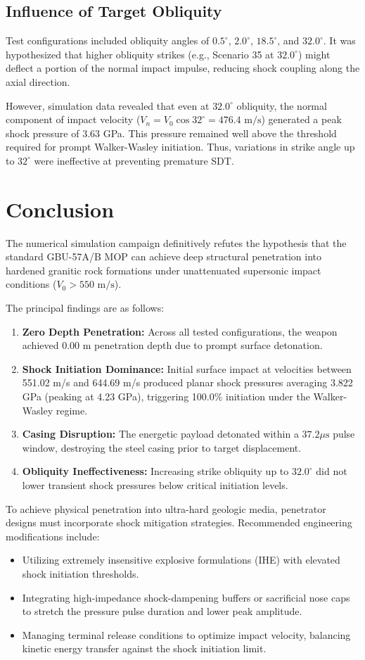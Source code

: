 \documentclass[11pt,a4paper]{article}
\begin{document}
\subsection{Influence of Target Obliquity}
Test configurations included obliquity angles of $0.5^\circ$, $2.0^\circ$, $18.5^\circ$, and $32.0^\circ$. It was hypothesized that higher obliquity strikes (e.g., Scenario 35 at $32.0^\circ$) might deflect a portion of the normal impact impulse, reducing shock coupling along the axial direction.

However, simulation data revealed that even at $32.0^\circ$ obliquity, the normal component of impact velocity ($V_n = V_0 \cos 32^\circ = 476.4\text{ m/s}$) generated a peak shock pressure of 3.63 GPa. This pressure remained well above the threshold required for prompt Walker-Wasley initiation. Thus, variations in strike angle up to $32^\circ$ were ineffective at preventing premature SDT.

\section{Conclusion}
The numerical simulation campaign definitively refutes the hypothesis that the standard GBU-57A/B MOP can achieve deep structural penetration into hardened granitic rock formations under unattenuated supersonic impact conditions ($V_0 > 550\text{ m/s}$). 

The principal findings are as follows:
\begin{enumerate}
\item \textbf{Zero Depth Penetration:} Across all tested configurations, the weapon achieved 0.00 m penetration depth due to prompt surface detonation.
\item \textbf{Shock Initiation Dominance:} Initial surface impact at velocities between 551.02 m/s and 644.69 m/s produced planar shock pressures averaging 3.822 GPa (peaking at 4.23 GPa), triggering 100.0\% initiation under the Walker-Wasley regime.
\item \textbf{Casing Disruption:} The energetic payload detonated within a $37.2\mu\text{s}$ pulse window, destroying the steel casing prior to target displacement.
\item \textbf{Obliquity Ineffectiveness:} Increasing strike obliquity up to $32.0^\circ$ did not lower transient shock pressures below critical initiation levels.
\end{enumerate}

To achieve physical penetration into ultra-hard geologic media, penetrator designs must incorporate shock mitigation strategies. Recommended engineering modifications include:
\begin{itemize}
\item Utilizing extremely insensitive explosive formulations (IHE) with elevated shock initiation thresholds.
\item Integrating high-impedance shock-dampening buffers or sacrificial nose caps to stretch the pressure pulse duration and lower peak amplitude.
\item Managing terminal release conditions to optimize impact velocity, balancing kinetic energy transfer against the shock initiation limit.
\end{itemize}
\end{document}
